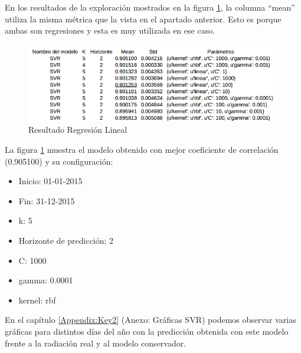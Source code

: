 En los resultados de la exploración mostrados en la figura \ref{resultado_svr}, la columna ``mean'' utiliza la misma métrica que la vista en el apartado anterior. Esto es porque ambas son regresiones y esta es muy utilizada en ese caso.

\begin{figure}[htb]
	\begin{center}
		\includegraphics[width=14cm]{figures/resultado_svr.png}
		\caption{Resultado Regresión Lineal \label{resultado_svr}}
	\end{center}
\end{figure}

La figura \ref{resultado_svr} muestra el modelo obtenido con mejor coeficiente de correlación (0.905100) y su configuración:

\begin{itemize}
\item Inicio: 01-01-2015
\item Fin: 31-12-2015
\item k: 5
\item Horizonte de predicción: 2
\item C: 1000
\item gamma: 0.0001
\item kernel: rbf 
\end{itemize}

En el capítulo \ref{Appendix:Key2} (Anexo: Gráficas SVR) podemos observar varias gráficas para distintos días del año con la predicción obtenida con este modelo frente a la radiación real y al modelo conservador.



